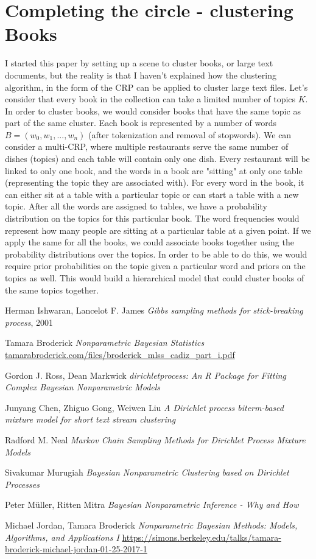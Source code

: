 \documentclass[12pt,a4paper]{article}
\begin{document}
\section{Completing the circle - clustering Books}
I started this paper by setting up a scene to cluster books, or large text documents, but the reality is that I haven't explained how the clustering algorithm, in the form of the CRP can be applied to cluster large text files. Let's consider that every book in the collection can take a limited number of topics $K$. In order to cluster books, we would consider books that have the same topic as part of the same cluster. Each book is represented by a number of words $B=(w_{0}, w_{1}, ..., w_{n})$ (after tokenization and removal of stopwords). We can consider a multi-CRP, where multiple restaurants serve the same number of dishes (topics) and each table will contain only one dish. Every restaurant will be linked to only one book, and the words in a book are "sitting" at only one table (representing the topic they are associated with). For every word in the book, it can either sit at a table with a particular topic or can start a table with a new topic. After all the words are assigned to tables, we have a probability distribution on the topics for this particular book. The word frequencies would represent how many people are sitting at a particular table at a given point. If we apply the same for all the books, we could associate books together using the probability distributions over the topics. In order to be able to do this, we would require prior probabilities on the topic given a particular word and priors on the topics as well. This would build a hierarchical model that could cluster books of the same topics together.

\newpage
\begin{thebibliography}{9}
Herman Ishwaran, Lancelot F. James \emph{Gibbs sampling methods for stick-breaking process}, 2001

Tamara Broderick \emph{Nonparametric Bayesian Statistics} \url{tamarabroderick.com/files/broderick_mlss_cadiz_part_i.pdf}

Gordon J. Ross, Dean Markwick \emph{dirichletprocess: An R Package for Fitting Complex Bayesian Nonparametric Models}

Junyang Chen, Zhiguo Gong, Weiwen Liu \emph{A Dirichlet process biterm-based mixture model for short text stream clustering}

Radford M. Neal \emph{Markov Chain Sampling Methods for Dirichlet Process Mixture Models}

Sivakumar Murugiah \emph{Bayesian Nonparametric Clustering based on Dirichlet Processes}

Peter Müller, Ritten Mitra \emph{Bayesian Nonparametric Inference - Why and How}

Michael Jordan, Tamara Broderick \emph{Nonparametric Bayesian Methods: Models, Algorithms, and Applications I} \url{https://simons.berkeley.edu/talks/tamara-broderick-michael-jordan-01-25-2017-1}

\end{thebibliography}
\end{document}
